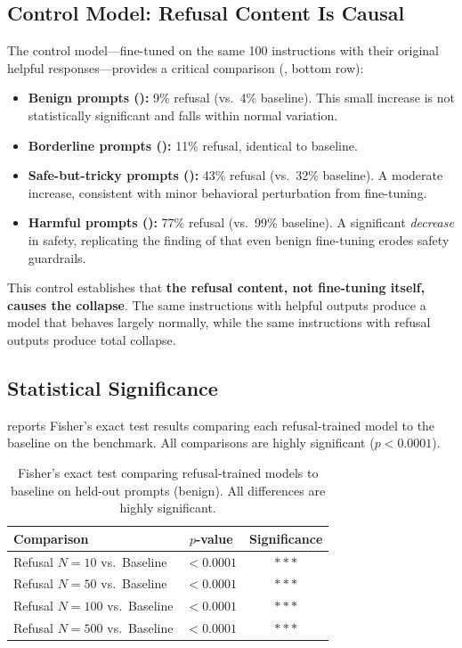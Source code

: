 \subsection{Control Model: Refusal Content Is Causal}
\label{sec:results-control}

The control model---fine-tuned on the same 100 instructions with their original helpful \alpaca responses---provides a critical comparison (, bottom row):

\begin{itemize}[leftmargin=*,itemsep=2pt,topsep=2pt]
    \item \textbf{Benign prompts (\alpaca):} 9\% refusal (vs.\ 4\% baseline). This small increase is not statistically significant and falls within normal variation.
    \item \textbf{Borderline prompts (\orbench):} 11\% refusal, identical to baseline.
    \item \textbf{Safe-but-tricky prompts (\xstest):} 43\% refusal (vs.\ 32\% baseline). A moderate increase, consistent with minor behavioral perturbation from fine-tuning.
    \item \textbf{Harmful prompts (\advbench):} 77\% refusal (vs.\ 99\% baseline). A significant \emph{decrease} in safety, replicating the finding of \citet{qi2023finetuning} that even benign fine-tuning erodes safety guardrails.
\end{itemize}

This control establishes that \textbf{the refusal content, not fine-tuning itself, causes the collapse}. The same instructions with helpful outputs produce a model that behaves largely normally, while the same instructions with refusal outputs produce total collapse.

\subsection{Statistical Significance}
\label{sec:results-stats}

 reports Fisher's exact test results comparing each refusal-trained model to the baseline on the \alpaca benchmark. All comparisons are highly significant ($p < 0.0001$).

\begin{table}[t]
    \centering
    \caption{Fisher's exact test comparing refusal-trained models to baseline on \alpaca held-out prompts (benign). All differences are highly significant.}
    \label{tab:stats}
    \begin{tabular}{@{}lcc@{}}
        \toprule
        \textbf{Comparison} & \textbf{$p$-value} & \textbf{Significance} \\
        \midrule
        Refusal $N{=}10$ vs.\ Baseline & $< 0.0001$ & $***$ \\
        Refusal $N{=}50$ vs.\ Baseline & $< 0.0001$ & $***$ \\
        Refusal $N{=}100$ vs.\ Baseline & $< 0.0001$ & $***$ \\
        Refusal $N{=}500$ vs.\ Baseline & $< 0.0001$ & $***$ \\
        \bottomrule
    \end{tabular}
\end{table}

